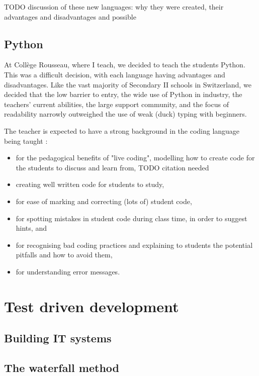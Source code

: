 \documentclass[10pt]{article}
\begin{document}
TODO discussion of these new languages: why they were created, their advantages and disadvantages and possible 

\subsection{Python}
At Collège Rousseau, where I teach, we decided to teach the students Python. This was a difficult decision, with each language having advantages and disadvantages. Like the vast majority of Secondary II schools in Switzerland, we decided that the low barrier to entry, the wide use of Python in industry, the teachers' current abilities, the large support community, and the focus of readability narrowly outweighed the use of weak (duck) typing with beginners.

The teacher is expected to have a strong background in the coding language being taught :
\begin{itemize}
\item for the pedagogical benefits of "live coding", modelling how to create code for the students to discuss and learn from, TODO citation needed
\item creating well written code for students to study,
\item for ease of marking and correcting (lots of) student code,
\item for spotting mistakes in student code during class time, in order to suggest hints, and
\item for recognising bad coding practices and explaining to students the potential pitfalls and how to avoid them,
\item for understanding error messages.
\end{itemize}





\section{Test driven development} \label{tdd}

\subsection{Building IT systems}

\subsection{The waterfall method}
\end{document}
